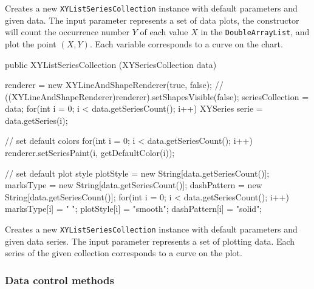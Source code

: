 \begin{tabb}
   Creates a new \texttt{XYListSeriesCollection} instance with default parameters and given data.
   The input parameter represents a set of data plots, the constructor will count the occurrence number
   $Y$ of each value $X$ in the \texttt{DoubleArrayList}, and plot the point $(X, Y)$.
   Each  variable corresponds to a curve on the chart.
\end{tabb}
\begin{htmlonly}
\end{htmlonly}
\begin{code}

   public XYListSeriesCollection (XYSeriesCollection data) \begin{hide} {
      renderer = new XYLineAndShapeRenderer(true, false);
    //  ((XYLineAndShapeRenderer)renderer).setShapesVisible(false);
      seriesCollection = data;
      for(int i = 0; i < data.getSeriesCount(); i++) {
         XYSeries serie = data.getSeries(i);
      }

      // set default colors
      for(int i = 0; i < data.getSeriesCount(); i++) {
         renderer.setSeriesPaint(i, getDefaultColor(i));
      }

      // set default plot style
      plotStyle = new String[data.getSeriesCount()];
      marksType = new String[data.getSeriesCount()];
      dashPattern = new String[data.getSeriesCount()];
      for(int i = 0; i < data.getSeriesCount(); i++) {
         marksType[i] = " ";
         plotStyle[i] = "smooth";
         dashPattern[i] = "solid";
      }
   }\end{hide}
\end{code}
\begin{tabb}
   Creates a new \texttt{XYListSeriesCollection} instance with default parameters and given data series.
   The input parameter represents a set of plotting data.
   Each series of the given collection corresponds to a curve on the plot.
\end{tabb}
\begin{htmlonly}
\end{htmlonly}


\subsubsection*{Data control methods}

